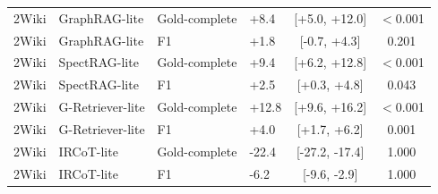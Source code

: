 \begin{table}[t]
{\begin{tabular}{llllcc}
2Wiki & GraphRAG-lite & Gold-complete & +8.4 & [+5.0, +12.0] & $<$0.001 \\
2Wiki & GraphRAG-lite & F1 & +1.8 & [-0.7, +4.3] & 0.201 \\
2Wiki & SpectRAG-lite & Gold-complete & +9.4 & [+6.2, +12.8] & $<$0.001 \\
2Wiki & SpectRAG-lite & F1 & +2.5 & [+0.3, +4.8] & 0.043 \\
2Wiki & G-Retriever-lite & Gold-complete & +12.8 & [+9.6, +16.2] & $<$0.001 \\
2Wiki & G-Retriever-lite & F1 & +4.0 & [+1.7, +6.2] & 0.001 \\
2Wiki & IRCoT-lite & Gold-complete & -22.4 & [-27.2, -17.4] & 1.000 \\
2Wiki & IRCoT-lite & F1 & -6.2 & [-9.6, -2.9] & 1.000 \\
\bottomrule
\end{tabular}}
\end{table}